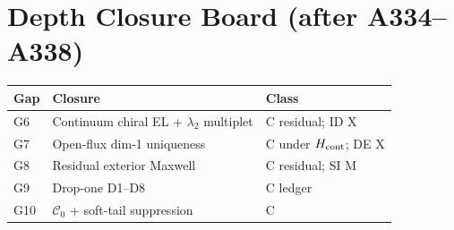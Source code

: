 \section*{Depth Closure Board (after A334--A338)}
\begin{center}
\begin{tabular}{@{}p{2cm}p{5.5cm}p{4.8cm}@{}}
\toprule
Gap & Closure & Class \\
\midrule
G6 & Continuum chiral EL + $\lambda_2$ multiplet & C residual; ID X \\
G7 & Open-flux dim-1 uniqueness & C under $H_{\rm cont}$; DE X \\
G8 & Residual exterior Maxwell & C residual; SI M \\
G9 & Drop-one D1--D8 & C ledger \\
G10 & $\mathcal{C}_0$ + soft-tail suppression & C \\
\bottomrule
\end{tabular}
\end{center}
